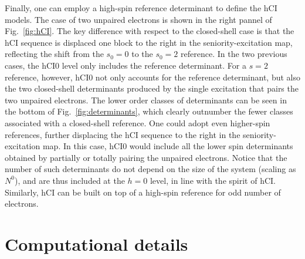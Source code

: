 \documentclass[aip,jcp,reprint,noshowkeys,superscriptaddress]{revtex4-1}
\begin{document}
Finally, one can employ a high-spin reference determinant to define the hCI models.
The case of two unpaired electrons is shown in the right pannel of Fig.~\ref{fig:hCI}.
The key difference with respect to the closed-shell case is that the hCI sequence is displaced one block to the right in the seniority-excitation map,
reflecting the shift from the $s_0=0$ to the $s_0=2$ reference.
In the two previous cases, the hCI0 level only includes the reference determinant.
For a $s=2$ reference, however, hCI0 not only accounts for the reference determinant,
but also the two closed-shell determinants produced by the single excitation that pairs the two unpaired electrons.
The lower order classes of determinants can be seen in the bottom of Fig.~\ref{fig:determinants},
which clearly outnumber the fewer classes associated with a closed-shell reference.
One could adopt even higher-spin references, further displacing the hCI sequence to the right in the seniority-excitation map.
In this case, hCI0 would include all the lower spin determinants obtained by partially or totally pairing the unpaired electrons.
Notice that the number of such determinants do not depend on the size of the system (scaling as $N^0$), and are thus included at the $h=0$ level, in line with the spirit of hCI.
Similarly, hCI can be built on top of a high-spin reference for odd number of electrons.



\section{Computational details}
\label{sec:compdet}
\end{document}
